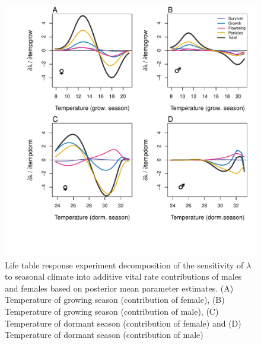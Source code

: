 \documentclass[12pt]{article}
\begin{document}
\begin{figure}[H]
  \begin{center}
    \includegraphics[width=0.95\linewidth]{Figures/LTRE_Temperature.pdf}
  \caption{Life table response experiment decomposition of the sensitivity of $\lambda$ to seasonal climate into additive vital rate contributions of males and females based on posterior mean parameter estimates.
 (A) Temperature of growing season (contribution of female), (B) Temperature of growing season (contribution of male),  (C) Temperature of dormant season (contribution of female) and (D) Temperature of dormant season (contribution of male)}
  \label{Sup:LTRETemp}
  \end{center}
\end{figure}
\end{document}

